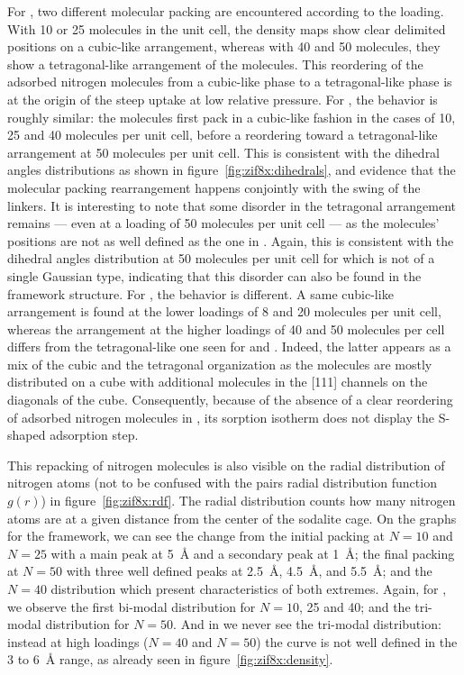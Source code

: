 \documentclass[thesis]{subfiles}
\begin{document}
For , two different molecular packing are encountered according to the
loading. With 10 or 25 molecules in the unit cell, the density maps show clear
delimited positions on a cubic-like arrangement, whereas with 40 and 50
molecules, they show a tetragonal-like arrangement of the molecules. This
reordering of the adsorbed nitrogen molecules from a cubic-like phase to a
tetragonal-like phase is at the origin of the steep uptake at low relative
pressure. For \ZIFCl, the behavior is roughly similar: the molecules first pack
in a cubic-like fashion in the cases of 10, 25 and 40 molecules per unit cell,
before a reordering toward a tetragonal-like arrangement at 50 molecules per
unit cell. This is consistent with the dihedral angles distributions as shown in
figure~\ref{fig:zif8x:dihedrals}, and evidence that the molecular packing
rearrangement happens conjointly with the swing of the linkers. It is
interesting to note that some disorder in the tetragonal arrangement remains ---
even at a loading of 50 molecules per unit cell --- as the molecules' positions
are not as well defined as the one in . Again, this is consistent with the
dihedral angles distribution at 50 molecules per unit cell for \ZIFCl which is
not of a single Gaussian type, indicating that this disorder can also be found
in the framework structure. For \ZIFBr, the behavior is different. A same
cubic-like arrangement is found at the lower loadings of 8 and 20 molecules per
unit cell, whereas the arrangement at the higher loadings of 40 and 50 molecules
per cell differs from the tetragonal-like one seen for  and \ZIFCl. Indeed,
the latter appears as a mix of the cubic and the tetragonal organization as the
molecules are mostly distributed on a cube with additional molecules in the
[111] channels on the diagonals of the cube. Consequently, because of the
absence of a clear reordering of adsorbed nitrogen molecules in \ZIFBr, its
sorption isotherm does not display the S-shaped adsorption step.

This repacking of nitrogen molecules is also visible on the radial distribution
of nitrogen atoms (not to be confused with the pairs radial distribution
function $g(r)$) in figure~\ref{fig:zif8x:rdf}. The radial distribution counts
how many nitrogen atoms are at a given distance from the center of the sodalite
cage. On the graphs for the  framework, we can see the change from the
initial packing at $N = 10$ and $N = 25$ with a main peak at \SI{5}{\AA} and a
secondary peak at \SI{1}{\AA}; the final packing at $N = 50$ with three well
defined peaks at \SI{2.5}{\AA}, \SI{4.5}{\AA}, and \SI{5.5}{\AA}; and the $N =
40$ distribution which present characteristics of both extremes. Again, for
\ZIFCl, we observe the first bi-modal distribution for $N = 10$, 25 and 40; and
the tri-modal distribution for $N = 50$. And in \ZIFBr we never see the
tri-modal distribution: instead at high loadings ($N = 40$ and $N = 50$) the
curve is not well defined in the 3 to \SI{6}{\AA} range, as already seen in
figure~\ref{fig:zif8x:density}.
\end{document}
